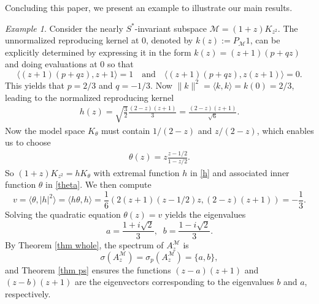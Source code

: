 \documentclass[12pt,reqno]{amsart}
\theoremstyle{definition}
\theoremstyle{remark}
\newtheorem{exm}[thm]{Example}
\numberwithin{equation}{section}
\newcommand{\la}{\langle}
\newcommand{\ra}{\rangle}
\newcommand{\ma}{\mathcal}
\begin{document}
Concluding this paper, we present an example to illustrate our main results.

\begin{exm}\label{exm si}Consider the nearly $S^*$-invariant subspace $\ma{M}=(1+z)K_{z^2}$. The unnormalized reproducing kernel at 0, denoted by \(k(z):= P_{\ma{M}}1 \), can be explicitly determined by expressing it in the form \( k(z) = (z+1)(p+qz) \) and doing evaluations at 0 so that
$$\la (z+1)(p+qz), z+1 \ra = 1 \quad \text{and} \quad \la (z+1)(p
+qz), z(z+1) \ra=0.$$ This yields that $ p = 2/3 $ and $q = -1/3$. Now $ \|k\|^{2} = \langle k, k \rangle = k(0) = 2/3$, leading to the normalized  reproducing kernel
\begin{align}
h(z) = \sqrt{\frac{3}{2}} \frac{(2-z)(z+1)}{3} = \frac{(2-z)(z+1)}{\sqrt{6}}.\label{h}\end{align} Now the model space \( K_{\theta} \) must contain \(1/(2-z)\) and \(z/(2-z)\), which enables us to choose
\begin{align}
\theta(z) = z \frac{z - 1/2}{1 - z/2}.\label{theta}\end{align}
So $(1+z)K_{z^2}=hK_\theta$ with  extremal function $h$ in \eqref{h} and  associated inner function $\theta$ in \eqref{theta}.  We then compute
$$v=\la\theta,|h|^2\ra=\la h \theta, h \ra= \frac{1}{6} \left(2(z+1)(z- 1/2)z, (2-z)(z+1) \right)= -\frac{1}{3}.$$
Solving the quadratic equation \( \theta(z) = v \) yields the eigenvalues $$a=\frac{1+i\sqrt{2}}{3},\;\;b=\frac{1-i\sqrt{2}}{3}.$$  By Theorem \ref{thm whole}, the spectrum of $A_z^\ma{M}$ is $$\sigma(A_z^{\ma{M}})=\sigma_p(A_z^\ma{M})=\{a, b\},$$ and Theorem \ref{thm ps} ensures the functions  $ (z-a)(z+1)$ and $(z-b)(z+1)$ are the eigenvectors corresponding to the eigenvalues $b$ and $a$, respectively.


\end{exm}
\end{document}
